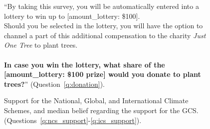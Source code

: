 \begin{figure}[h!]
    \caption[Amounts donated to plant trees.]{``By taking this survey, you will be automatically entered into a lottery to win up to [amount\_lottery: \$100]. \\Should you be selected in the lottery, you will have the option to channel a part of this additional compensation to the charity \textit{Just One Tree} to plant trees.\\\\\textbf{In case you win the lottery, what share of the [amount\_lottery: \$100 prize] would you donate to plant trees?}'' (Question~\ref{q:donation}).
    }\label{fig:donation}
\end{figure}


\begin{figure}[h!]
    \caption[Support for the NCS, GCS, ICS, and belief of support for GCS]{Support for the National, Global, and International Climate Schemes, and median belief regarding the support for the GCS. (Questions~\ref{q:ncs_support}-\ref{q:ics_support}).
    }\label{fig:ncs_gcs_ics}
\end{figure} 

